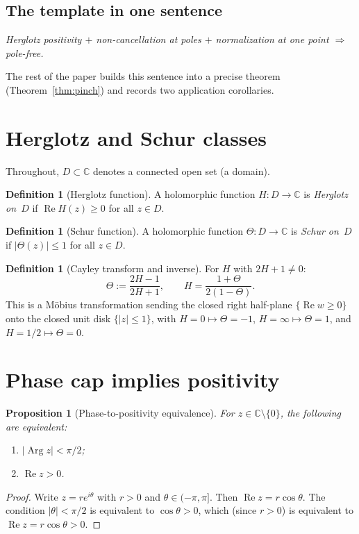 \documentclass[11pt]{amsart}
\newtheorem{proposition}[theorem]{Proposition}
\theoremstyle{definition}
\newtheorem{definition}[theorem]{Definition}
\theoremstyle{remark}
\newcommand{\C}{\mathbb{C}}
\DeclareMathOperator{\re}{Re}
\DeclareMathOperator{\Arg}{Arg}
\begin{document}
\subsection*{The template in one sentence}
\emph{Herglotz positivity $+$ non-cancellation at poles $+$
normalization at one point $\Longrightarrow$ pole-free.}

The rest of the paper builds this sentence into a precise theorem
(Theorem~\ref{thm:pinch}) and records two application corollaries.

\section{Herglotz and Schur classes}\label{sec:classes}

Throughout, $D\subset\C$ denotes a connected open set (a domain).

\begin{definition}[Herglotz function]\label{def:herglotz}
A holomorphic function $H:D\to\C$ is \emph{Herglotz on~$D$} if
$\re H(z)\ge 0$ for all $z\in D$.
\end{definition}

\begin{definition}[Schur function]\label{def:schur}
A holomorphic function $\Theta:D\to\C$ is \emph{Schur on~$D$} if
$|\Theta(z)|\le 1$ for all $z\in D$.
\end{definition}

\begin{definition}[Cayley transform and inverse]\label{def:cayley}
For $H$ with $2H+1\neq 0$:
\[
\Theta:=\frac{2H-1}{2H+1},\qquad
H=\frac{1+\Theta}{2(1-\Theta)}.
\]
This is a M\"obius transformation sending the closed right half-plane
$\{\re w\ge0\}$ onto the closed unit disk $\{|z|\le1\}$, with
$H=0\mapsto\Theta=-1$, $H=\infty\mapsto\Theta=1$, and
$H=1/2\mapsto\Theta=0$.
\end{definition}

\section{Phase cap implies positivity}\label{sec:phase}

\begin{proposition}[Phase-to-positivity equivalence]\label{prop:phase}
For $z\in\C\setminus\{0\}$, the following are equivalent:
\begin{enumerate}[label=\textup{(\roman*)},nosep]
\item $|\Arg z|<\pi/2$;
\item $\re z>0$.
\end{enumerate}
\end{proposition}
\begin{proof}
Write $z=re^{i\theta}$ with $r>0$ and $\theta\in(-\pi,\pi]$.
Then $\re z=r\cos\theta$.
The condition $|\theta|<\pi/2$ is equivalent to $\cos\theta>0$,
which (since $r>0$) is equivalent to $\re z=r\cos\theta>0$.
\end{proof}
\end{document}
